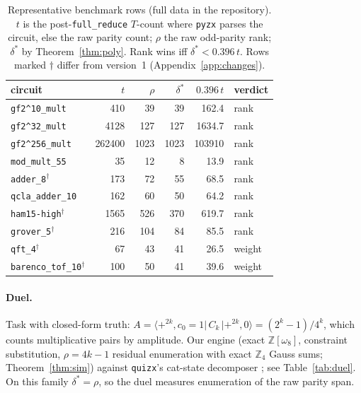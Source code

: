 \documentclass[11pt]{article}
\theoremstyle{definition}
\theoremstyle{remark}
\newcommand{\Z}{\mathbb{Z}}
\newcommand{\ds}{\delta^{*}}
\newcommand{\code}[1]{\texttt{#1}}
\begin{document}
\begin{table}[ht]
\centering
\caption{Representative benchmark rows (full data in the repository). $t$ is the post-\code{full\_reduce}
$T$-count where \code{pyzx} parses the circuit, else the raw parity count; $\rho$ the raw
odd-parity rank; $\ds$ by Theorem~\ref{thm:poly}. Rank wins iff $\ds<0.396\,t$. Rows marked $\dagger$ differ
from version~1 (Appendix~\ref{app:changes}).}\label{tab:bench}
\smallskip
\begin{tabular}{lrrrrl}
\toprule
circuit & $t$ & $\rho$ & $\ds$ & $0.396\,t$ & verdict\\
\midrule
\code{gf2\textasciicircum10\_mult} & 410 & 39 & 39 & 162.4 & rank\\
\code{gf2\textasciicircum32\_mult} & 4128 & 127 & 127 & 1634.7 & rank\\
\code{gf2\textasciicircum256\_mult} & 262400 & 1023 & 1023 & 103910 & rank\\
\code{mod\_mult\_55} & 35 & 12 & 8 & 13.9 & rank\\
\code{adder\_8}$^{\dagger}$ & 173 & 72 & 55 & 68.5 & rank\\
\code{qcla\_adder\_10} & 162 & 60 & 50 & 64.2 & rank\\
\code{ham15-high}$^{\dagger}$ & 1565 & 526 & 370 & 619.7 & rank\\
\code{grover\_5}$^{\dagger}$ & 216 & 104 & 84 & 85.5 & rank\\
\code{qft\_4}$^{\dagger}$ & 67 & 43 & 41 & 26.5 & weight\\
\code{barenco\_tof\_10}$^{\dagger}$ & 100 & 50 & 41 & 39.6 & weight\\
\bottomrule
\end{tabular}
\end{table}

\paragraph{Duel.} Task with closed-form truth: $A=\langle+^{2k},c_0{=}1|\,C_k\,|+^{2k},0\rangle=(2^k-1)/4^k$, which counts
multiplicative pairs by amplitude. Our engine (exact $\Z[\omega_8]$, constraint substitution, $\rho=4k-1$
residual enumeration with exact $\Z_4$ Gauss sums; Theorem~\ref{thm:sim}) against \code{quizx}'s cat-state decomposer
\cite{KvdW21,KvdWV22}; see Table~\ref{tab:duel}. On this family $\ds=\rho$, so the duel measures enumeration of the raw
parity span.
\end{document}
